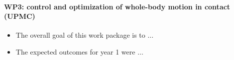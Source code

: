 \paragraph{WP3: control and optimization of whole-body motion in contact (UPMC)}

\begin{itemize}
\item The overall goal of this work package is to $\dots$

\item The expected outcomes for year 1 were $\dots$  
\end{itemize}